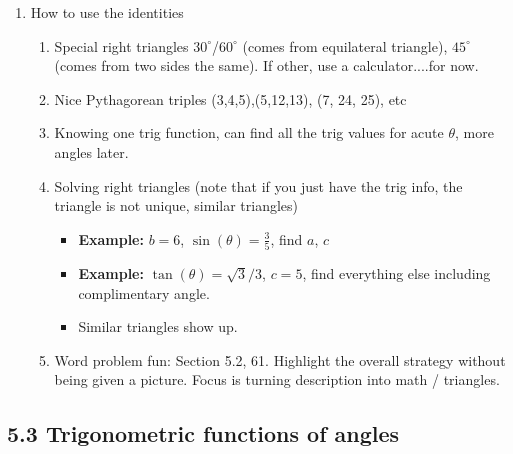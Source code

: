 \documentclass{article}
\begin{document}
\begin{enumerate}
\item How to use the identities
\begin{enumerate}
\item Special right triangles $30^\circ$/$60^\circ$ (comes from equilateral triangle), $45^\circ$ (comes from two sides the same). If other, use a calculator....for now.
\item Nice Pythagorean triples (3,4,5),(5,12,13), (7, 24, 25), etc
\item Knowing one trig function, can find all the trig values for acute $\theta$, more angles later.
\item Solving right triangles (note that if you just have the trig info, the triangle is not unique, similar triangles)
\begin{itemize}
\item {\bf Example:} $b = 6$, $\sin(\theta) = \frac{3}{5}$, find $a$, $c$
\item {\bf Example:} $\tan(\theta) = \sqrt{3}/3$, $c = 5$, find everything else including complimentary angle. 
\item Similar triangles show up.
\end{itemize}

\item Word problem fun: Section 5.2, 61. Highlight the overall strategy without being given a picture. Focus is turning description into math / triangles.

\end{enumerate}
\end{enumerate}


\subsection{5.3 Trigonometric functions of angles}
\end{document}
